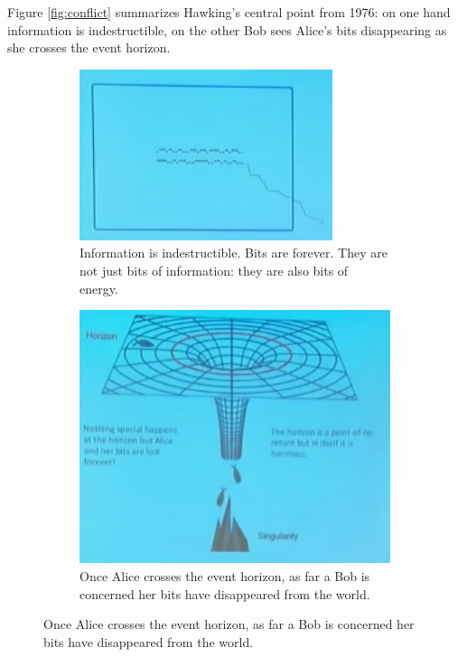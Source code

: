 \documentclass[]{article}
\begin{document}
Figure \ref{fig:conflict} summarizes Hawking's central point from 1976: on one hand information is indestructible, on the other Bob sees Alice's bits disappearing as she crosses the event horizon.
\begin{figure}[H]
	\caption{Conflict of principles: a paradox.}\label{fig:conflict}
	\begin{subfigure}[t]{0.45\textwidth}
		\caption{Information is indestructible. Bits are forever. They are not just bits of information: they are also bits of energy.}
		\includegraphics[width=\textwidth]{wh-kcwc-1st}
	\end{subfigure}
	\;
	\begin{subfigure}[t]{0.45\textwidth}
		\caption{Once Alice crosses the event horizon, as far a Bob is concerned her bits have disappeared from the world.}
		\includegraphics[width=\textwidth]{wh-black-hole}
	\end{subfigure}
\end{figure}
\end{document}
